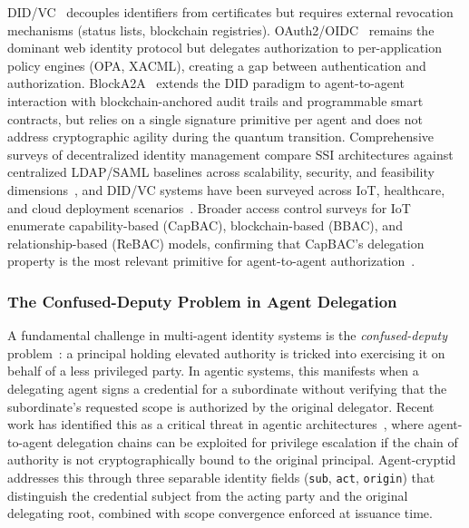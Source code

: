 \documentclass[10pt,twocolumn]{IEEEtran}
\begin{document}
DID/VC~\cite{ref:did-vc} decouples identifiers from certificates but
requires external revocation mechanisms (status lists, blockchain
registries). OAuth2/OIDC~\cite{ref:oauth2} remains the dominant web identity
protocol but delegates authorization to per-application policy engines
(OPA, XACML), creating a gap between authentication and authorization.
BlockA2A~\cite{ref:blocka2a} extends the DID paradigm to agent-to-agent
interaction with blockchain-anchored audit trails and programmable
smart contracts, but relies on a single signature primitive per agent
and does not address cryptographic agility during the quantum
transition. Comprehensive surveys of decentralized identity management
compare SSI architectures against centralized LDAP/SAML baselines across
scalability, security, and feasibility dimensions~\cite{ref:did-survey},
and DID/VC systems have been surveyed across IoT, healthcare, and cloud
deployment scenarios~\cite{ref:did-survey}. Broader access control surveys
for IoT enumerate capability-based (CapBAC), blockchain-based (BBAC),
and relationship-based (ReBAC) models, confirming that CapBAC's delegation
property is the most relevant primitive for agent-to-agent
authorization~\cite{ref:iot-access-control-survey,ref:capbac-delegation-survey}.

\subsubsection*{The Confused-Deputy Problem in Agent Delegation}

A fundamental challenge in multi-agent identity systems is the
\emph{confused-deputy} problem~\cite{ref:hardy1988}: a principal holding
elevated authority is tricked into exercising it on behalf of a less
privileged party. In agentic systems, this manifests when a delegating
agent signs a credential for a subordinate without verifying that the
subordinate's requested scope is authorized by the original delegator.
Recent work has identified this as a critical threat in agentic
architectures~\cite{ref:agentic-threat-model,ref:mitre-atlas}, where
agent-to-agent delegation chains can be exploited for privilege escalation
if the chain of authority is not cryptographically bound to the original
principal. Agent-cryptid addresses this through three separable identity
fields (\texttt{sub}, \texttt{act}, \texttt{origin}) that distinguish
the credential subject from the acting party and the original delegating
root, combined with scope convergence enforced at issuance time.
\end{document}
